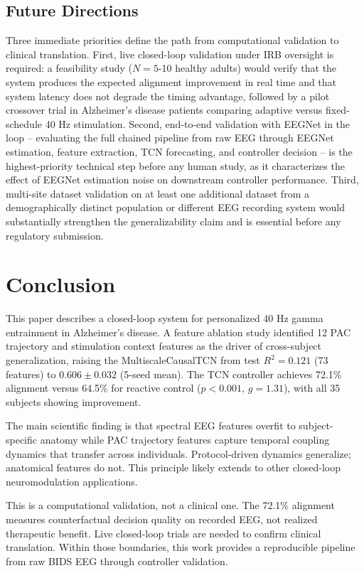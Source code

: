 \documentclass[11pt,letterpaper]{article}
\begin{document}
\subsection{Future Directions}

Three immediate priorities define the path from computational validation to clinical translation. First, live closed-loop validation under IRB oversight is required: a feasibility study ($N = 5$-10 healthy adults) would verify that the system produces the expected alignment improvement in real time and that system latency does not degrade the timing advantage, followed by a pilot crossover trial in Alzheimer's disease patients comparing adaptive versus fixed-schedule 40 Hz stimulation. Second, end-to-end validation with EEGNet in the loop -- evaluating the full chained pipeline from raw EEG through EEGNet estimation, feature extraction, TCN forecasting, and controller decision -- is the highest-priority technical step before any human study, as it characterizes the effect of EEGNet estimation noise on downstream controller performance. Third, multi-site dataset validation on at least one additional dataset from a demographically distinct population or different EEG recording system would substantially strengthen the generalizability claim and is essential before any regulatory submission.

\section{Conclusion}

This paper describes a closed-loop system for personalized 40 Hz gamma entrainment in Alzheimer's disease. A feature ablation study identified 12 PAC trajectory and stimulation context features as the driver of cross-subject generalization, raising the MultiscaleCausalTCN from test $R^2 = 0.121$ (73 features) to $0.606 \pm 0.032$ (5-seed mean). The TCN controller achieves 72.1\% alignment versus 64.5\% for reactive control ($p < 0.001$, $g = 1.31$), with all 35 subjects showing improvement.

The main scientific finding is that spectral EEG features overfit to subject-specific anatomy while PAC trajectory features capture temporal coupling dynamics that transfer across individuals. Protocol-driven dynamics generalize; anatomical features do not. This principle likely extends to other closed-loop neuromodulation applications.

This is a computational validation, not a clinical one. The 72.1\% alignment measures counterfactual decision quality on recorded EEG, not realized therapeutic benefit. Live closed-loop trials are needed to confirm clinical translation. Within those boundaries, this work provides a reproducible pipeline from raw BIDS EEG through controller validation.
\end{document}
